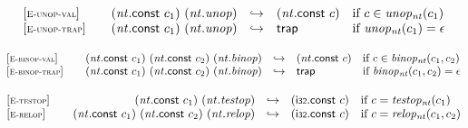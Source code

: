 \vspace{1ex}

$$
\begin{array}[t]{@{}lrcl@{}l@{}}
{[\textsc{\scriptsize E{-}unop{-}val}]} \quad & ({\mathit{nt}}{.}\mathsf{const}~c_1)~({\mathit{nt}} {.} {\mathit{unop}}) & \hookrightarrow & ({\mathit{nt}}{.}\mathsf{const}~c) & \quad \mbox{if}~ c \in {{\mathit{unop}}}{{}_{{\mathit{nt}}}(c_1)} \\
{[\textsc{\scriptsize E{-}unop{-}trap}]} \quad & ({\mathit{nt}}{.}\mathsf{const}~c_1)~({\mathit{nt}} {.} {\mathit{unop}}) & \hookrightarrow & \mathsf{trap} & \quad \mbox{if}~ {{\mathit{unop}}}{{}_{{\mathit{nt}}}(c_1)} = \epsilon \\
\end{array}
$$

\vspace{1ex}

$$
\begin{array}[t]{@{}lrcl@{}l@{}}
{[\textsc{\scriptsize E{-}binop{-}val}]} \quad & ({\mathit{nt}}{.}\mathsf{const}~c_1)~({\mathit{nt}}{.}\mathsf{const}~c_2)~({\mathit{nt}} {.} {\mathit{binop}}) & \hookrightarrow & ({\mathit{nt}}{.}\mathsf{const}~c) & \quad \mbox{if}~ c \in {{\mathit{binop}}}{{}_{{\mathit{nt}}}(c_1, c_2)} \\
{[\textsc{\scriptsize E{-}binop{-}trap}]} \quad & ({\mathit{nt}}{.}\mathsf{const}~c_1)~({\mathit{nt}}{.}\mathsf{const}~c_2)~({\mathit{nt}} {.} {\mathit{binop}}) & \hookrightarrow & \mathsf{trap} & \quad \mbox{if}~ {{\mathit{binop}}}{{}_{{\mathit{nt}}}(c_1, c_2)} = \epsilon \\
\end{array}
$$

\vspace{1ex}

$$
\begin{array}[t]{@{}lrcl@{}l@{}}
{[\textsc{\scriptsize E{-}testop}]} \quad & ({\mathit{nt}}{.}\mathsf{const}~c_1)~({\mathit{nt}} {.} {\mathit{testop}}) & \hookrightarrow & (\mathsf{i{\scriptstyle 32}}{.}\mathsf{const}~c) & \quad \mbox{if}~ c = {{\mathit{testop}}}{{}_{{\mathit{nt}}}(c_1)} \\
{[\textsc{\scriptsize E{-}relop}]} \quad & ({\mathit{nt}}{.}\mathsf{const}~c_1)~({\mathit{nt}}{.}\mathsf{const}~c_2)~({\mathit{nt}} {.} {\mathit{relop}}) & \hookrightarrow & (\mathsf{i{\scriptstyle 32}}{.}\mathsf{const}~c) & \quad \mbox{if}~ c = {{\mathit{relop}}}{{}_{{\mathit{nt}}}(c_1, c_2)} \\
\end{array}
$$

